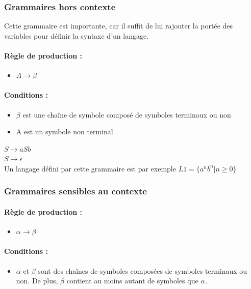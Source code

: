 \subsubsection{Grammaires hors contexte}
Cette grammaire est importante, car il suffit de lui rajouter la portée des 
variables pour définir la syntaxe d'un langage.

\paragraph{Règle de production :} 
\begin{itemize}
	\item $A \rightarrow \beta$
\end{itemize}

\paragraph{Conditions :}

\begin{itemize}
	\item  $\beta$ est une chaîne de symbole composé de symboles terminaux
	       	ou non
	\item A est un symbole non terminal
\end{itemize}

\begin{myexem}
	$S \rightarrow aSb$ \\
	$S \rightarrow \epsilon$ \\
	Un langage défini par cette grammaire est par exemple $L1 = \{a^nb^n|n 
		\geq 0\}$
\end{myexem}

\subsubsection{Grammaires sensibles au contexte}
\paragraph{Règle de production :} 
\begin{itemize}
	\item $\alpha \rightarrow \beta$
\end{itemize}

\paragraph{Conditions :}
\begin{itemize}
	\item $\alpha$ et $\beta$ sont des chaînes de symboles composées de 
		symboles terminaux ou non. De plus, $\beta$ contient au moins 
		autant de symboles que $\alpha$.
\end{itemize}

